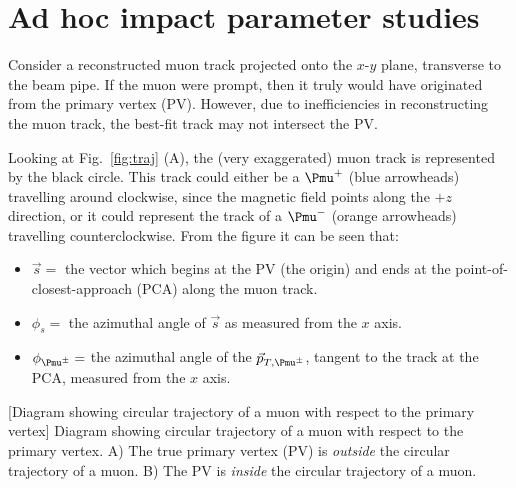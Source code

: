 

\chapter{Ad hoc impact parameter studies}
\label{app:adhoc_studies}


Consider a reconstructed muon track projected onto the $x$-$y$ plane, transverse to the beam pipe.
If the muon were prompt, then it truly would have originated from the primary vertex (PV).
However, due to inefficiencies in reconstructing the muon track, 
the best-fit track may not intersect the PV. 

Looking at Fig.~\ref{fig:traj} (A), the (very exaggerated) muon track is represented by the black circle.
This track could either be a $\Pmu^+$ (blue arrowheads) travelling around clockwise, since the magnetic field points along the $+z$ direction,
or it could represent the track of a $\Pmu^-$ (orange arrowheads) travelling counterclockwise.
From the figure it can be seen that:
\begin{itemize}
    \item $\vec{s} =$ the vector which begins at the PV (the origin) and ends at the point-of-closest-approach (PCA) along the muon track.
    \item $\phi_s =$ the azimuthal angle of ${\vec{s}}$ as measured from the $x$ axis.
    \item $\phi_{\Pmu^{\pm}} =$ the azimuthal angle of the $\vec{p}_{T,\Pmu^{\pm}}$, tangent to the track at the PCA, measured from the $x$ axis.
\end{itemize}
\begin{multiFigure}
    \centering
            [Diagram showing circular trajectory of a muon with respect to the primary vertex]
            {Diagram showing circular trajectory of a muon with respect to the primary vertex.
            \;A) The true primary vertex (PV) is \emph{outside} the circular trajectory of a muon.
            \;B) The PV is \emph{inside} the circular trajectory of a muon.
            } 
        \label{fig:traj}
\end{multiFigure}

